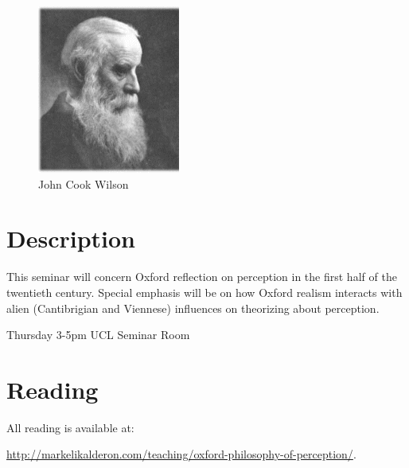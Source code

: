 \documentclass[11pt]{article}
\title{\mytitle}%
\author{\myauthor}
\date{} %
\begin{document}
\maketitle

\setlength{\parindent}{1em}


\begin{figure}[htbp]
	\centering
		\includegraphics[scale=1]{../graphics/wilson.jpg}
	\caption{John Cook Wilson}
	\label{fig:wilson}
\end{figure}

\section{Description}\label{sec:description} %

This seminar will concern Oxford reflection on perception in the first half of the twentieth century. Special emphasis will be on how Oxford realism interacts with alien (Cantibrigian and Viennese) influences on theorizing about perception.

Thursday 3-5pm UCL Seminar Room


\section{Reading}\label{sec:reading} %

All reading is available at:

\noindent \url{http://markelikalderon.com/teaching/oxford-philosophy-of-perception/}.
\end{document}
